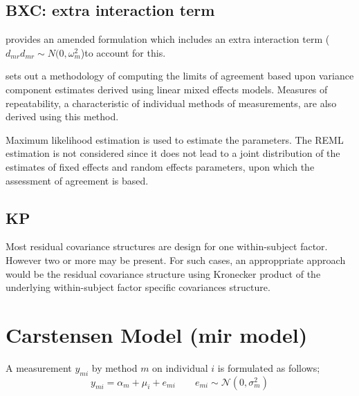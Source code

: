 \documentclass[12pt, a4paper]{report}
\theoremstyle{plain}
\theoremstyle{definition}
\theoremstyle{remark}
\begin{document}
\subsection{BXC: extra interaction	term}


\citet{BXC2004} provides an amended formulation which includes an extra interaction
term ($d_{mr} d_{mr} \sim N(0,\omega^{2}_{m}$)to account for this.

\citet{BXC2008} sets out a methodology of computing the limits of
agreement based upon variance component estimates derived using
linear mixed effects models. Measures of repeatability, a
characteristic of individual methods of measurements, are also
derived using this method.





Maximum likelihood estimation is used to estimate the parameters.
The REML estimation is not considered since it does not lead to a
joint distribution of the estimates of fixed effects and random
effects parameters, upon which the assessment of agreement is
based.



\subsection{KP}
Most residual covariance structures are design for one
within-subject factor. However two or more may be present. For
such cases, an approppriate approach would be the residual
covariance structure using Kronecker product of the underlying
within-subject factor specific covariances structure.


\section{Carstensen Model (mir model)}

A measurement $y_{mi}$ by method $m$ on individual $i$ is formulated as follows;
\begin{equation}
y_{mi}  = \alpha_{m} + \mu_{i} + e_{mi} \qquad  e_{mi} \sim
\mathcal{N}(0,\sigma^{2}_{m})
\end{equation}
\end{document}
